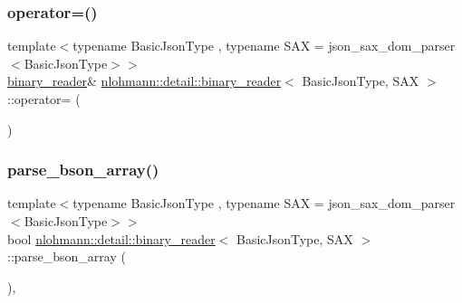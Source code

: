 \mbox{\label{classnlohmann_1_1detail_1_1binary__reader_a7ba0e555da725a2efa17048e67aec9a9}} 
\subsubsection{\texorpdfstring{operator=()}{operator=()}\hspace{0.1cm}{\footnotesize\ttfamily [2/2]}}
{\footnotesize\ttfamily template$<$typename Basic\+Json\+Type , typename S\+AX  = json\+\_\+sax\+\_\+dom\+\_\+parser$<$\+Basic\+Json\+Type$>$$>$ \\
\hyperlink{classnlohmann_1_1detail_1_1binary__reader}{binary\+\_\+reader}\& \hyperlink{classnlohmann_1_1detail_1_1binary__reader}{nlohmann\+::detail\+::binary\+\_\+reader}$<$ Basic\+Json\+Type, S\+AX $>$\+::operator= (\begin{DoxyParamCaption}\item[{\hyperlink{classnlohmann_1_1detail_1_1binary__reader}{binary\+\_\+reader}$<$ Basic\+Json\+Type, S\+AX $>$ \&\&}]{ }\end{DoxyParamCaption})\hspace{0.3cm}{\ttfamily [default]}}

\mbox{\label{classnlohmann_1_1detail_1_1binary__reader_a650dd6f9f05e86eb62cd4717301a5ffa}} 
\subsubsection{\texorpdfstring{parse\+\_\+bson\+\_\+array()}{parse\_bson\_array()}}
{\footnotesize\ttfamily template$<$typename Basic\+Json\+Type , typename S\+AX  = json\+\_\+sax\+\_\+dom\+\_\+parser$<$\+Basic\+Json\+Type$>$$>$ \\
bool \hyperlink{classnlohmann_1_1detail_1_1binary__reader}{nlohmann\+::detail\+::binary\+\_\+reader}$<$ Basic\+Json\+Type, S\+AX $>$\+::parse\+\_\+bson\+\_\+array (\begin{DoxyParamCaption}{ }\end{DoxyParamCaption})\hspace{0.3cm}{\ttfamily [inline]}, {\ttfamily [private]}}



